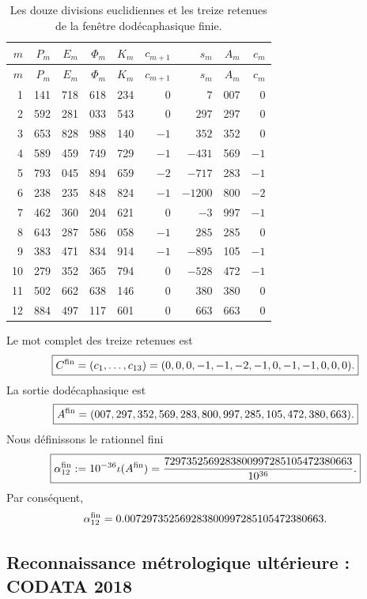 \begingroup
\scriptsize
\setlength{\tabcolsep}{3.2pt}
\begin{longtable}{@{}r|rrrr|r|r|r|r@{}}
\caption{Les douze divisions euclidiennes et les treize retenues de la fenêtre
dodécaphasique finie.}
\label{p3-83-c25-s5:tab:acarreo-alpha-finito-autonomo}\\
\toprule
\(m\)&\(P_m\)&\(E_m\)&\(\Phi_m\)&\(K_m\)&
\(c_{m+1}\)&\(s_m\)&\(A_m\)&\(c_m\)\\
\midrule
\endfirsthead
\toprule
\(m\)&\(P_m\)&\(E_m\)&\(\Phi_m\)&\(K_m\)&
\(c_{m+1}\)&\(s_m\)&\(A_m\)&\(c_m\)\\
\midrule
\endhead
1  &141&718&618&234& \(0\)& \(7\)&007& \(0\)\\
2  &592&281&033&543& \(0\)& \(297\)&297& \(0\)\\
3  &653&828&988&140& \(-1\)& \(352\)&352& \(0\)\\
4  &589&459&749&729& \(-1\)& \(-431\)&569& \(-1\)\\
5  &793&045&894&659& \(-2\)& \(-717\)&283& \(-1\)\\
6  &238&235&848&824& \(-1\)& \(-1200\)&800& \(-2\)\\
7  &462&360&204&621& \(0\)& \(-3\)&997& \(-1\)\\
8  &643&287&586&058& \(-1\)& \(285\)&285& \(0\)\\
9  &383&471&834&914& \(-1\)& \(-895\)&105& \(-1\)\\
10 &279&352&365&794& \(0\)& \(-528\)&472& \(-1\)\\
11 &502&662&638&146& \(0\)& \(380\)&380& \(0\)\\
12 &884&497&117&601& \(0\)& \(663\)&663& \(0\)\\
\bottomrule
\end{longtable}
\endgroup

Le mot complet des treize retenues est
\[
 \boxed{
 C^{\rm fin}
 =(c_1,\ldots,c_{13})
 =(0,0,0,-1,-1,-2,-1,0,-1,-1,0,0,0).}
\]
La sortie dodécaphasique est
\[
 \boxed{
 A^{\rm fin}
 =(007,297,352,569,283,800,997,285,105,472,380,663).}
\]
Nous définissons le rationnel fini
\begin{equation}
 \boxed{
 \alpha_{12}^{\rm fin}
 :=10^{-36}\iota(A^{\rm fin})
 =\frac{7297352569283800997285105472380663}{10^{36}}.}
 \label{p3-83-c25-s5:eq:alpha-finita-autonoma}
\end{equation}
Par conséquent,
\[
 \alpha_{12}^{\rm fin}
 =0.007297352569283800997285105472380663.
\]

\subsection{Reconnaissance métrologique ultérieure : CODATA 2018}


